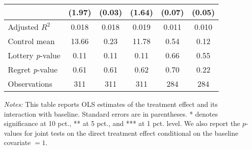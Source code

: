\begin{table}[h]
{\begin{threeparttable}
\begin{tabular}{l*{5}{c}}
                &   (1.97)         &   (0.03)         &   (1.64)         &   (0.07)         &   (0.05)         \\
\midrule
Adjusted \(R^{2}\)&    0.018         &    0.018         &    0.019         &    0.011         &    0.010         \\
Control mean    &    13.66         &     0.23         &    11.78         &     0.54         &     0.12         \\
Lottery \emph{p}-value&     0.11         &     0.11         &     0.11         &     0.66         &     0.55         \\
Regret \emph{p}-value&     0.61         &     0.61         &     0.62         &     0.70         &     0.22         \\
Observations    &      311         &      311         &      311         &      284         &      284         \\
\bottomrule \end{tabular} \begin{tablenotes}[flushleft] \footnotesize \item \emph{Notes:} This table reports OLS estimates of the treatment effect and its interaction with baseline. Standard errors are in parentheses. * denotes significance at 10 pct., ** at 5 pct., and *** at 1 pct. level. We also report the \(p\)-values for joint tests on the direct treatment effect conditional on the baseline covariate $= 1$. \end{tablenotes} \end{threeparttable} } \end{table}

